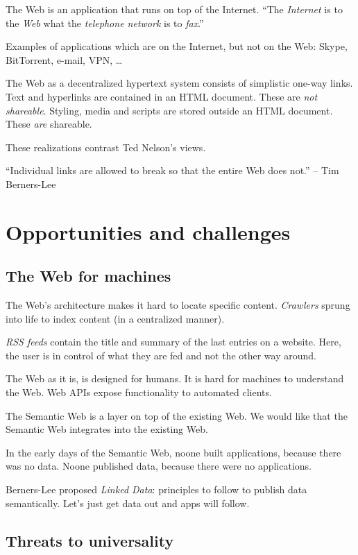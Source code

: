 \documentclass{report}
\begin{document}
The Web is an application that runs on top of the Internet.
``The \emph{Internet} is to the \emph{Web}
what the \emph{telephone network} is to \emph{fax}.''

Examples of applications which are on the Internet,
but not on the Web:
Skype, BitTorrent, e-mail, VPN, \dots

The Web as a decentralized hypertext system
consists of simplistic one-way links.
Text and hyperlinks are contained in an HTML document.
These are \emph{not shareable}.
Styling, media and scripts are stored outside an HTML document.
These \emph{are} shareable.

These realizations contrast Ted Nelson's views.

``Individual links are allowed to break
so that the entire Web does not.'' -- Tim Berners-Lee

\section{Opportunities and challenges}

\subsection{The Web for machines}

The Web's architecture makes it hard
to locate specific content.
\emph{Crawlers} sprung into life
to index content (in a centralized manner).

\emph{RSS feeds} contain the title and summary
of the last entries on a website.
Here, the user is in control of what they are fed
and not the other way around.

The Web as it is, is designed for humans.
It is hard for machines to understand the Web.
Web APIs expose functionality to automated clients.

The Semantic Web is a layer
on top of the existing Web.
We would like that the Semantic Web
integrates into the existing Web.

In the early days of the Semantic Web,
noone built applications, because there was no data.
Noone published data, because there were no applications.

Berners-Lee proposed \emph{Linked Data}:
principles to follow to publish data semantically.
Let's just get data out and apps will follow.

\subsection{Threats to universality}
\end{document}
